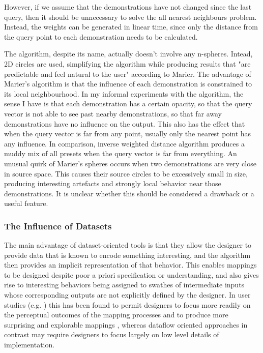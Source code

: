 \documentclass[main.tex]{subfiles}
\begin{document}
However, if we assume that the demonstrations have not changed since the last
query, then it should be unnecessary to solve the all nearest neighbours
problem.  Instead, the weights can be generated in linear time, since only the
distance from the query point to each demonstration needs to be calculated.

The algorithm, despite its name, actually doesn't involve any n-spheres.
Intead, 2D circles are used, simplifying the algorithm while producing results
that "are predictable and feel natural to the user" according to Marier. The
advantage of Marier's algorithm is that the influence of each demonstration is
constrained to its local neighbourhood. In my informal experiments with the
algorithm, the sense I have is that each demonstration has a certain opacity,
so that the query vector is not able to see past nearby demonstrations, so that
far away demonstrations have no influence on the output. This also has the
effect that when the query vector is far from any point, usually only the
nearest point has any influence. In comparison, inverse weighted distance
algorithm produces a muddy mix of all presets when the query vector is far from
everything. An unusual quirk of Marier's spheres occurs when two demonstrations
are very close in source space. This causes their source circles to be
excessively small in size, producing interesting artefacts and strongly local
behavior near those demonstrations. It is unclear whether this should be
considered a drawback or a useful feature.

\subsubsection{The Influence of Datasets}

The main advantage of dataset-oriented tools is that they allow the designer to
provide data that is known to encode something interesting, and the algorithm
then provides an implicit representation of that behavior. This enables
mappings to be designed despite poor a priori specification or understanding,
and also gives rise to interesting behaviors being assigned to swathes of
intermediate inputs whose corresponding outputs are not explicitly defined by
the designer. In user studies (e.g. \cite{Fiebrink2011}) this has been found to
permit designers to focus more readily on the perceptual outcomes of the
mapping processes and to produce more surprising and explorable mappings ,
whereas dataflow oriented approaches in contrast may require designers to focus
largely on low level details of implementation.
\end{document}
